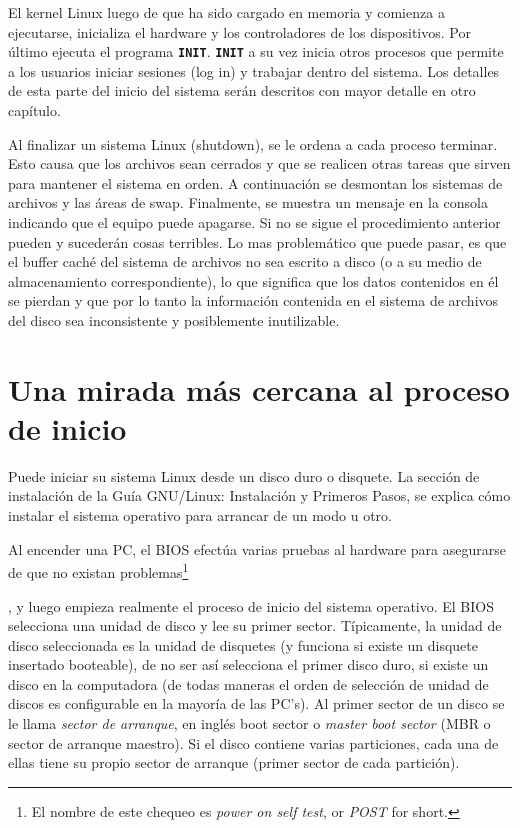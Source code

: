 \documentclass[12pt]{article}
\begin{document}
 El kernel Linux luego de que ha sido cargado en memoria y comienza a
ejecutarse, inicializa el hardware y los controladores de los dispositivos. Por
último ejecuta el programa \texttt{\textbf{INIT}}. \texttt{\textbf{INIT}} a su
vez inicia otros procesos que permite a los usuarios iniciar sesiones (log in) y
trabajar dentro del sistema. Los detalles de esta parte del inicio del sistema
serán descritos con mayor detalle en otro capítulo.  

 Al finalizar un sistema Linux (shutdown), se le ordena a cada proceso
terminar. Esto causa que los archivos sean cerrados y que se realicen otras
tareas que sirven para mantener el sistema en orden. A continuación se desmontan
los sistemas de archivos y las áreas de swap. Finalmente, se muestra un mensaje
en la consola indicando que el equipo puede apagarse. Si no se sigue el
procedimiento anterior pueden y sucederán cosas terribles. Lo mas problemático
que puede pasar, es que el buffer caché del sistema de archivos no sea escrito a
disco (o a su medio de almacenamiento correspondiente), lo que significa que los
datos contenidos en él se pierdan y que por lo tanto la información contenida en
el sistema de archivos del disco sea inconsistente y posiblemente inutilizable.
 


\section{ Una mirada más cercana al proceso de inicio}

 Puede iniciar su sistema Linux desde un disco duro o disquete. La sección
de instalación de la Guía GNU/Linux: Instalación y Primeros Pasos, se explica
cómo instalar el sistema operativo para arrancar de un modo u otro.  



 Al encender una PC, el BIOS efectúa varias pruebas al hardware para
asegurarse de que no existan problemas\footnote{El nombre de este chequeo es
\textit{power on self test}, or \textit{POST} for
short.}
		
, y luego empieza realmente el proceso de inicio del sistema operativo. El BIOS
selecciona una unidad de disco y lee su primer sector. Típicamente, la unidad de
disco seleccionada es la unidad de disquetes (y funciona si existe un disquete
insertado booteable), de no ser así selecciona el primer disco duro, si existe
un disco en la computadora (de todas maneras el orden de selección de unidad de
discos es configurable en la mayoría de las PC's). Al primer sector de un disco
se le llama \textit{sector de arranque}, en inglés boot sector o
\textit{master boot sector} (MBR o sector de arranque maestro). Si
el disco contiene varias particiones, cada una de ellas tiene su propio sector
de arranque (primer sector de cada partición).  
\end{document}
